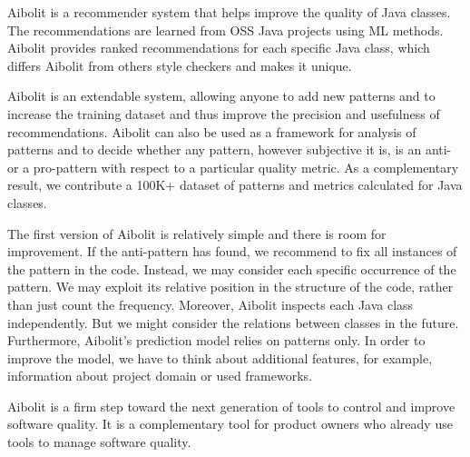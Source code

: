
Aibolit is a recommender system that helps improve the quality of Java classes.
The recommendations are learned from OSS Java projects using ML methods.
Aibolit provides ranked recommendations for each specific Java class,
which differs Aibolit from others style checkers and makes it unique.

Aibolit is an extendable system, allowing anyone to add new patterns and to
increase the training dataset and thus improve the precision and usefulness
of recommendations. Aibolit can also be used as a framework for analysis of
patterns and to decide whether any pattern, however subjective it is, is an anti- or a pro-pattern
with respect to a particular quality metric. As a complementary result,
we contribute a 100K+ dataset of patterns and metrics calculated for Java classes.

The first version of Aibolit is relatively simple and there is room
for improvement. If the anti-pattern has found, we recommend to fix all instances
of the pattern in the code. Instead, we may consider each specific occurrence of the pattern.
We may exploit its relative position in the structure of the code, rather than just count
the frequency. Moreover, Aibolit inspects each Java class independently. But
we might consider the relations between classes in the future. Furthermore,
Aibolit's prediction model relies on patterns only. In order to improve the model,
we have to think about additional features, for example, information about
project domain or used frameworks.

Aibolit is a firm step toward the next generation of tools to control
and improve software quality. It is a complementary tool for
product owners who already use tools to manage software quality.
